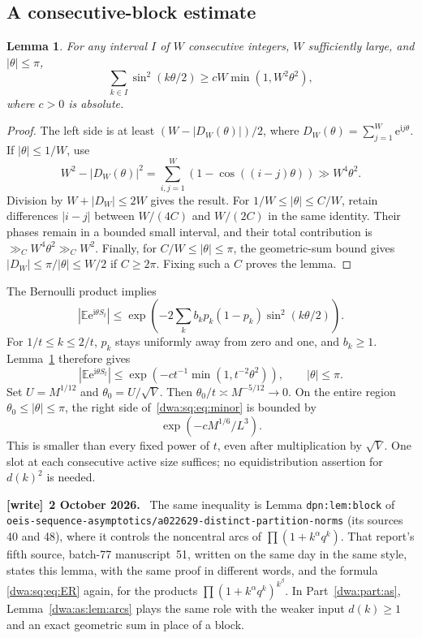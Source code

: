 \documentclass[11pt,letterpaper]{article}
\newcommand{\file}[1]{\nolinkurl{#1}}
\numberwithin{equation}{section}
\newtheorem{lemma}[theorem]{Lemma}
\theoremstyle{remark}
\newcommand{\e}{\mathrm e}
\newcommand{\ii}{\mathrm i}
\newcommand{\E}{\mathbb E}
\newenvironment{writenote}[1][]{\par\smallskip\begingroup\small
 \noindent\textbf{[write]}\if\relax\detokenize{#1}\relax\else~\textbf{#1.}\fi\ }%
 {\par\endgroup\smallskip}
\begin{document}
\subsection{A consecutive-block estimate}
\begin{lemma}\label{dwa:sq:lem:block}
For any interval $I$ of $W$ consecutive integers, $W$ sufficiently large, and $|\theta|\le\pi$,
\begin{equation}\label{dwa:sq:eq:block}
 \sum_{k\in I}\sin^2(k\theta/2)
 \ge cW\min(1,W^2\theta^2),
\end{equation}
where $c>0$ is absolute.
\end{lemma}
\begin{proof}
The left side is at least $(W-|D_W(\theta)|)/2$, where $D_W(\theta)=\sum_{j=1}^W\e^{\ii j\theta}$. If $|\theta|\le1/W$, use
\[
 W^2-|D_W(\theta)|^2
 =\sum_{i,j=1}^W(1-\cos((i-j)\theta))\gg W^4\theta^2.
\]
Division by $W+|D_W|\le2W$ gives the result. For $1/W\le|\theta|\le C/W$, retain differences $|i-j|$ between $W/(4C)$ and $W/(2C)$ in the same identity. Their phases remain in a bounded small interval, and their total contribution is $\gg_CW^4\theta^2\gg_CW^2$. Finally, for $C/W\le|\theta|\le\pi$, the geometric-sum bound gives $|D_W|\le\pi/|\theta|\le W/2$ if $C\ge2\pi$. Fixing such a $C$ proves the lemma.
\end{proof}
The Bernoulli product implies
\[
 |\E\e^{\ii\theta S_t}|
 \le\exp\left(-2\sum_kb_kp_k(1-p_k)\sin^2(k\theta/2)\right).
\]
For $1/t\le k\le2/t$, $p_k$ stays uniformly away from zero and one, and $b_k\ge1$. Lemma~\ref{dwa:sq:lem:block} therefore gives
\begin{equation}\label{dwa:sq:eq:minor}
 |\E\e^{\ii\theta S_t}|
 \le\exp\left(-ct^{-1}\min(1,t^{-2}\theta^2)\right),
 \qquad |\theta|\le\pi.
\end{equation}
Set $U=M^{1/12}$ and $\theta_0=U/\sqrt V$. Then $\theta_0/t\asymp M^{-5/12}\to0$. On the entire region $\theta_0\le|\theta|\le\pi$, the right side of~\eqref{dwa:sq:eq:minor} is bounded by
\begin{equation}\label{dwa:sq:eq:minor-small}
 \exp(-cM^{1/6}/L^3).
\end{equation}
This is smaller than every fixed power of $t$, even after multiplication by $\sqrt V$. One slot at each consecutive active size suffices; no equidistribution assertion for $d(k)^2$ is needed.
\begin{writenote}[2 October 2026]
The same inequality is Lemma \texttt{dpn:lem:block} of \file{oeis-sequence-asymptotics/a022629-distinct-partition-norms} (its sources 40 and 48), where it controls the noncentral arcs of $\prod(1+k^\alpha q^k)$. That report's fifth source, batch-77 manuscript~51, written on the same day in the same style, states this lemma, with the same proof in different words, and the formula \eqref{dwa:sq:eq:ER} again, for the products $\prod(1+k^\alpha q^k)^{k^\beta}$. In Part~\ref{dwa:part:as}, Lemma~\ref{dwa:as:lem:arcs} plays the same role with the weaker input $d(k)\ge1$ and an exact geometric sum in place of a block.
\end{writenote}
\end{document}
